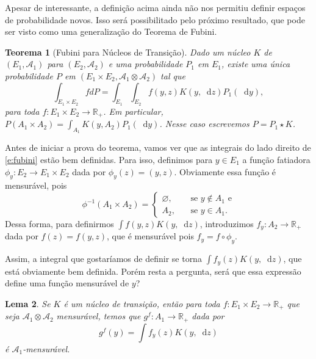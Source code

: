 \documentclass[reqno, draft]{book}
\newcommand*\1{\mathds{1}}
\newtheorem{theorem}{Teorema}[section]
\newtheorem{lemma}[theorem]{Lema}
\renewcommand*\d{\mathop{}\!\mathrm{d}}
\begin{document}
Apesar de interessante, a definição acima ainda não nos permitiu definir espaços de probabilidade novos.
Isso será possibilitado pelo próximo resultado, que pode ser visto como uma generalização do Teorema de Fubini.

\begin{theorem}[Fubini para Núcleos de Transição]
  \label{t:fubini}
  Dado um núcleo $K$ de $(E_1, \mathcal{A}_1)$ para $(E_2, \mathcal{A}_2)$ e uma probabilidade $P_1$ em $E_1$, existe uma única probabilidade $P$ em $(E_1 \times E_2, \mathcal{A}_1 \otimes \mathcal{A}_2)$ tal que
  \begin{equation}
    \label{e:fubini}
    \int_{E_1 \times E_2} f dP = \int_{E_1} \int_{E_2} f(y,z) K(y, \d z) P_1 (\d y),
  \end{equation}
  para toda $f:E_1 \times E_2 \to \mathbb{R}_+$.
  Em particular, $P(A_1 \times A_2) = \int_{A_1} K(y, A_2) P_1 (\d y)$.
  Nesse caso escrevemos $P = P_1 \star K$.
\end{theorem}

Antes de iniciar a prova do teorema, vamos ver que as integrais do lado direito de \eqref{e:fubini} estão bem definidas.
Para isso, definimos para $y \in E_1$ a função fatiadora $\phi_y: E_2 \to E_1 \times E_2$ dada por $\phi_y(z) = (y, z)$.
Obviamente essa função é mensurável, pois
\begin{equation}
  \phi^{-1}(A_1 \times A_2) =
  \begin{cases}
    \varnothing, \quad & \text{ se $y \not \in A_1$ e}\\
    A_2, & \text{ se $y \in A_1$}.
  \end{cases}
\end{equation}
Dessa forma, para definirmos $\int f(y,z) K(y, \d z)$, introduzimos $f_y: A_2 \to \mathbb{R}_+$ dada por $f(z) = f(y,z)$, que é mensurável pois $f_y = f \circ \phi_y$.

Assim, a integral que gostaríamos de definir se torna $\int f_y(z) K(y, \d z)$, que está obviamente bem definida.
Porém resta a pergunta, será que essa expressão define uma função mensurável de $y$?

\begin{lemma}
  Se $K$ é um núcleo de transição, então para toda $f: E_1 \times E_2 \to \mathbb{R}_+$ que seja $\mathcal{A}_1 \otimes \mathcal{A}_2$ mensurável, temos que $g^f:A_1 \to \mathbb{R}_+$ dada por
  \begin{equation}
    g^f(y) = \int f_y(z) K(y, \d z)
  \end{equation}
  é $\mathcal{A}_1$-mensurável.
\end{lemma}
\end{document}
